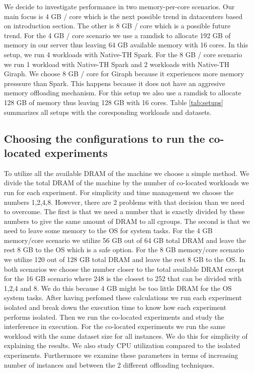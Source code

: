 We decide to investigate performance in two memory-per-core scenarios. Our main focus is 4 GB / core 
which is the next possible trend in datacenters based on introduction section. The other
is 8 GB / core which is a possible future trend. For the 4 GB / core scenario we use a ramdisk to 
allocate 192 GB of memory in our server thus leaving 64 GB available memory with 16 cores. In this setup, we run 4
workloads with Native-TH Spark. For the 8 GB / core scenario we run 1 workload with Native-TH Spark and 2 workloads with Native-TH Giraph. We choose 8 GB / core for Giraph because it experiences more memory presssure than Spark. This happens because it does not have
an aggresive memory offloading mechanism. For this setup we also use a ramdisk to allocate 128 GB of memory thus leaving 
128 GB with 16 cores. 
Table \ref{tab:setups} summarizes all setups with the coresponding workloads and datasets.

\subsection{Choosing the configurations to run the co-located experiments}
To utilize all the available DRAM of the machine we choose a simple method. 
We divide the total DRAM of the machine by the number of co-located workloads we run for each experiment.
For simplicity and time management we choose the numbers 1,2,4,8. However, there are 2 problems with that decision
than we need to overcome. The first is that we need a number that is exactly divided by these numbers to give the same amount of DRAM to
all cgroups. The second is that we need to leave some memory to the OS for system tasks. For the 4 GB memory/core scenario we utilize
56 GB out of 64 GB total DRAM and leave the rest 8 GB to the OS which is a safe option. For the 8 GB memory/core scenario we utilize
120 out of 128 GB total DRAM and leave the rest 8 GB to the OS. 
In both scenarios we choose the number closer to
the total available DRAM except for the 16 GB scenario where 248 is the closest to 252 that can be divided with 1,2,4 and 8. We do this because 4 GB might be too little DRAM for the OS system tasks. After having perfomed these calculations we run each experiment isolated and break down the execution time to know how each experiment performs isolated. Then we run the co-located experiments and study the interference in execution. For the co-located experiments we run the same workload with the same dataset size for all instances. We do this for simplicity of explaining the results. We also study CPU utilization compared to the isolated experiments. Furthermore we examine these parameters in terms of increasing number of instances and between the 2 different offloading techniques. 

